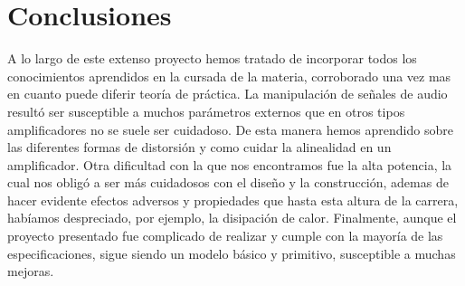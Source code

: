 \section{Conclusiones}

A lo largo de este extenso proyecto hemos tratado de incorporar todos los conocimientos aprendidos en la cursada de la materia, corroborado una vez mas en cuanto puede diferir teoría de práctica.
La manipulación de señales de audio resultó ser susceptible a muchos parámetros externos que en otros tipos amplificadores no se suele ser cuidadoso. De esta manera hemos aprendido sobre las diferentes formas de distorsión y como cuidar la alinealidad en un amplificador.
Otra dificultad con la que nos encontramos fue la alta potencia, la cual nos obligó a ser más cuidadosos con el diseño y la construcción, ademas de hacer evidente efectos adversos y propiedades que hasta esta altura de la carrera, habíamos despreciado, por ejemplo, la disipación de calor.
Finalmente, aunque el proyecto presentado fue complicado de realizar y cumple con la mayoría de las especificaciones, sigue siendo un modelo básico y primitivo, susceptible a muchas mejoras.

\bigskip